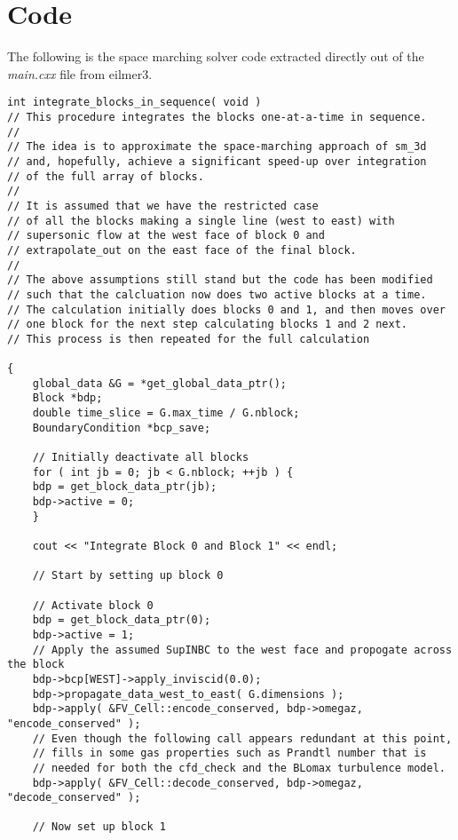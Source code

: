 
\newpage
\section{Code}
\label{code}

The following is the space marching solver code extracted directly out of the \textit{main.cxx} file from eilmer3.

{\scriptsize
\begin{verbatim}
int integrate_blocks_in_sequence( void )
// This procedure integrates the blocks one-at-a-time in sequence.
//
// The idea is to approximate the space-marching approach of sm_3d
// and, hopefully, achieve a significant speed-up over integration
// of the full array of blocks.
//
// It is assumed that we have the restricted case 
// of all the blocks making a single line (west to east) with
// supersonic flow at the west face of block 0 and 
// extrapolate_out on the east face of the final block.
//
// The above assumptions still stand but the code has been modified
// such that the calcluation now does two active blocks at a time.
// The calculation initially does blocks 0 and 1, and then moves over
// one block for the next step calculating blocks 1 and 2 next.
// This process is then repeated for the full calculation

{
    global_data &G = *get_global_data_ptr();
    Block *bdp;
    double time_slice = G.max_time / G.nblock;
    BoundaryCondition *bcp_save;

    // Initially deactivate all blocks
    for ( int jb = 0; jb < G.nblock; ++jb ) {
	bdp = get_block_data_ptr(jb);
	bdp->active = 0;
    }

    cout << "Integrate Block 0 and Block 1" << endl;

    // Start by setting up block 0

    // Activate block 0
    bdp = get_block_data_ptr(0);
    bdp->active = 1;
    // Apply the assumed SupINBC to the west face and propogate across the block
    bdp->bcp[WEST]->apply_inviscid(0.0);
    bdp->propagate_data_west_to_east( G.dimensions );
    bdp->apply( &FV_Cell::encode_conserved, bdp->omegaz, "encode_conserved" );
    // Even though the following call appears redundant at this point,
    // fills in some gas properties such as Prandtl number that is
    // needed for both the cfd_check and the BLomax turbulence model.
    bdp->apply( &FV_Cell::decode_conserved, bdp->omegaz, "decode_conserved" );

    // Now set up block 1


\end{verbatim}}
